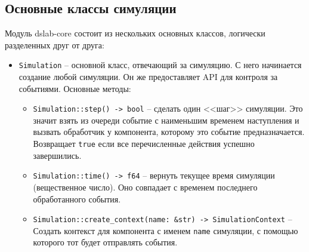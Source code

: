 \subsection{Основные классы симуляции}
Модуль dslab-core состоит из нескольких основных классов, логически разделенных друг от друга:
\begin{itemize}
    \item \texttt{Simulation} -- основной класс, отвечающий за симуляцию. С него начинается создание любой симуляции. Он же предоставляет API для контроля за событиями. Основные методы:
    \begin{itemize}
        \item \label{Simulation::step} \texttt{Simulation::step() -> bool} -- сделать один <<шаг>> симуляции. Это значит взять из очереди событие с наименьшим временем наступления и вызвать обработчик у компонента, которому это событие предназначается. Возвращает \texttt{true} если все перечисленные действия успешно завершились. 
        \item \texttt{Simulation::time() -> f64} -- вернуть текущее время симуляции (вещественное число). Оно совпадает с временем последнего обработанного события. 
        \item \label{Simulation::createcontext} \texttt{Simulation::create\_context(name: \&str) -> SimulationContext} -- Создать контекст для компонента с именем \texttt{name} симуляции, с помощью которого тот будет отправлять события.
    

\end{itemize}
\end{itemize}
